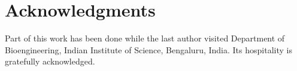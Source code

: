 \documentclass[10pt,letterpaper]{article}
\begin{document}
\section*{Acknowledgments}

Part of this work has been done while the last author visited Department of Bioengineering, Indian Institute of Science, Bengaluru, India.
 Its hospitality is gratefully acknowledged. 

\nolinenumbers

%
%


\end{document}

